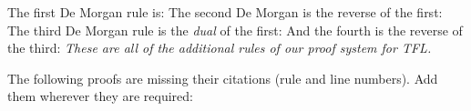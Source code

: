 The first De Morgan rule is:
The second De Morgan is the reverse of the first:
The third De Morgan rule is the \emph{dual} of the first:
And the fourth is the reverse of the third:
\emph{These are all of the additional rules of our proof system for TFL.}

\practiceproblems
\solutions
\problempart
\label{pr.justifyTFLproof}
The following proofs are missing their citations (rule and line numbers). Add them wherever they are required:
\begin{earg}
\item 
	\begin{fitchproof}
 {}
 {}
\end{fitchproof}
\item\begin{fitchproof}
\open
\close
{}
\end{fitchproof}
\item\begin{fitchproof}
\open
	 {}
		\open
	\close
\close
{}
\end{fitchproof}
\end{earg}

